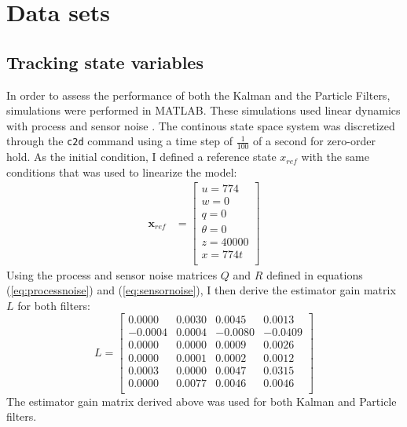 \section{Data sets} \label{sec:data}


\subsection{Tracking state variables}

In order to assess the performance of both the Kalman and the Particle
Filters, simulations were performed in MATLAB. These simulations
used linear dynamics with process and sensor noise . The continous state space system was
discretized through the \texttt{c2d} command using a time step of
$\frac{1}{100}$ of a second for zero-order hold. As the
initial condition, I defined a reference state $x_{ref}$ with the
same conditions that was used to linearize the model:
\begin{align}
  \mathbf{x}_{ref} &=
  \begin{bmatrix}
    u = 774 \\
    w = 0 \\
    q = 0 \\
    \theta = 0 \\
    z = 40000 \\
    x = 774t\\
  \end{bmatrix}
\end{align}
Using the process and sensor noise matrices $Q$ and $R$ defined
in equations (\ref{eq:processnoise}) and (\ref{eq:sensornoise}), I
then derive the estimator gain matrix $L$ for both filters:
\begin{equation} \label{eq:estgain}
  L =
  \begin{bmatrix}
    0.0000  &  0.0030 &   0.0045  &   0.0013 \\
    -0.0004  &  0.0004 &  -0.0080  &  -0.0409\\
    0.0000  &  0.0000 &   0.0009  &  0.0026\\
    0.0000  &  0.0001 &   0.0002  &  0.0012 \\
    0.0003  &  0.0000 &   0.0047  &  0.0315 \\
    0.0000  &  0.0077 &   0.0046  &  0.0046 \\
  \end{bmatrix}
\end{equation}
The estimator gain matrix derived above was used for both Kalman and
Particle filters.

